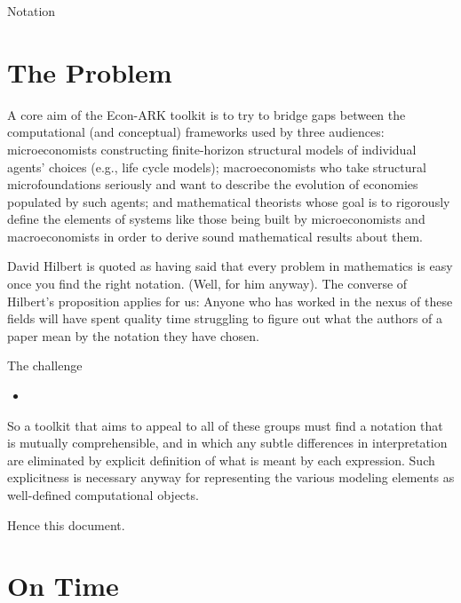 \documentclass[\econtexRoot/BufferStockTheory]{subfiles}
\begin{document}
\newcommand{\tnow}{t}

\centerline{\Large Notation}\label{sec:ontime}\hypertarget{ontime}{}

\section{The Problem}\label{sec:ontime}\hypertarget{ontime}{}

A core aim of the Econ-ARK toolkit is to try to bridge gaps between the computational (and conceptual) frameworks used by three audiences: microeconomists constructing finite-horizon structural models of individual agents' choices (e.g., life cycle models); macroeconomists who take structural microfoundations seriously and want to describe the evolution of economies populated by such agents; and mathematical theorists whose goal is to rigorously define the elements of systems like those being built by microeconomists and macroeconomists in order to derive sound mathematical results about them.

David Hilbert is quoted as having said that every problem in mathematics is easy once you find the right notation.  (Well, for him anyway).  The converse of Hilbert's proposition applies for us: Anyone who has worked in the nexus of these fields will have spent quality time struggling to figure out what the authors of a paper mean by the notation they have chosen.


The challenge
\begin{itemize}
\item 
\end{itemize}

So a toolkit that aims to appeal to all of these groups must find a notation that is mutually comprehensible, and in which any subtle differences in interpretation are eliminated by explicit definition of what is meant by each expression.
Such explicitness is necessary anyway for representing the various modeling elements as well-defined computational objects.

Hence this document.

\section{On Time}
\end{document}
